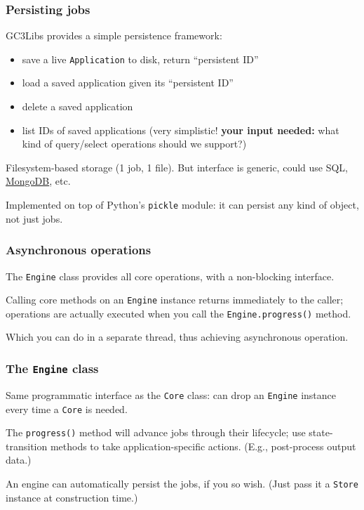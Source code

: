 \documentclass[presentation]{beamer}
\begin{document}
\begin{frame}
\frametitle{Persisting jobs}
\label{sec-19}

  GC3Libs provides a simple persistence framework: 
\begin{itemize}
\item save a live \texttt{Application} to disk, return ``persistent ID''
\item load a saved application given its ``persistent ID''
\item delete a saved application
\item list IDs of saved applications (very simplistic! \textbf{your input     needed:} what kind of query/select operations should we support?)
\end{itemize}

  Filesystem-based storage (1 job, 1 file).  But interface is generic,
  could use SQL, \href{http://www.mongodb.org}{MongoDB}, etc.

  Implemented on top of Python's \texttt{pickle} module: it can persist any
  kind of object, not just jobs.
\end{frame}
\begin{frame}
\frametitle{Asynchronous operations}
\label{sec-20}

  The \texttt{Engine} class provides all core operations, 
  with a non-blocking interface.

  Calling core methods on an \texttt{Engine} instance returns immediately to
  the caller; operations are actually executed when you call the
  \texttt{Engine.progress()} method.

  Which you can do in a separate thread, thus achieving
  asynchronous operation.
\end{frame}
\begin{frame}
\frametitle{The \texttt{Engine} class}
\label{sec-21}

  Same programmatic interface as the \texttt{Core} class:
  can drop an \texttt{Engine} instance every time a \texttt{Core} is needed.

  The \texttt{progress()} method will advance jobs through their lifecycle; 
  use state-transition methods to take application-specific actions.
  (E.g., post-process output data.)
  
  An engine can automatically persist the jobs, if you so wish.
  (Just pass it a \texttt{Store} instance at construction time.)
\end{frame}
\end{document}

